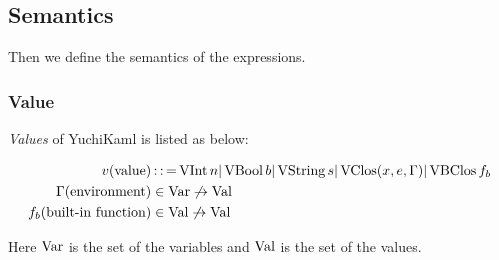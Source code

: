 \subsection{Semantics}

Then we define the semantics of the expressions.

\subsubsection{Value}
\emph{Values} of YuchiKaml is listed as below:

\begin{align*}
    v (\text{value}) &\operatorname{::=} \operatorname{\text{VInt}} n | \operatorname{\text{VBool}} b | \operatorname{\text{VString}} s | \operatorname{\text{VClos}} (x, e, \Gamma) | \operatorname{\text{VBClos}} f_b{}\\
    \Gamma  (\text{environment}) &\in \text{Var} \not\to\text{Val} \\
    f_b{} (\text{built-in function})&\in \text{Val}\not\to\text{Val}
\end{align*}

Here $\text{Var}$ is the set of the variables and $\text{Val}$ is the set of the values.
\subsubsection{}
